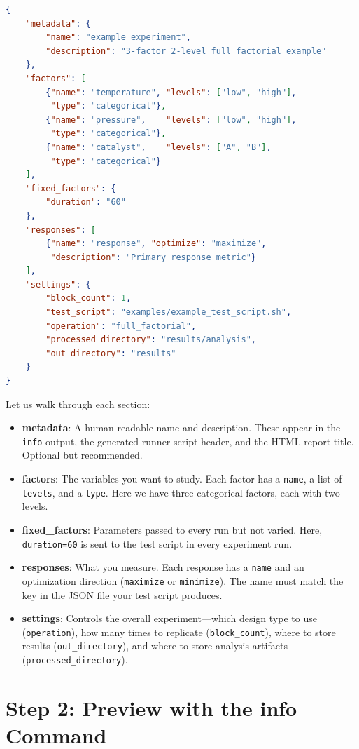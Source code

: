 \documentclass[11pt]{book}
\begin{document}
\begin{lstlisting}[language=json]
{
    "metadata": {
        "name": "example experiment",
        "description": "3-factor 2-level full factorial example"
    },
    "factors": [
        {"name": "temperature", "levels": ["low", "high"],
         "type": "categorical"},
        {"name": "pressure",    "levels": ["low", "high"],
         "type": "categorical"},
        {"name": "catalyst",    "levels": ["A", "B"],
         "type": "categorical"}
    ],
    "fixed_factors": {
        "duration": "60"
    },
    "responses": [
        {"name": "response", "optimize": "maximize",
         "description": "Primary response metric"}
    ],
    "settings": {
        "block_count": 1,
        "test_script": "examples/example_test_script.sh",
        "operation": "full_factorial",
        "processed_directory": "results/analysis",
        "out_directory": "results"
    }
}
\end{lstlisting}

Let us walk through each section:

\begin{itemize}
  \item \textbf{metadata}: A human-readable name and description. These appear in the \texttt{info} output, the generated runner script header, and the HTML report title. Optional but recommended.
  \item \textbf{factors}: The variables you want to study. Each factor has a \texttt{name}, a list of \texttt{levels}, and a \texttt{type}. Here we have three categorical factors, each with two levels.
  \item \textbf{fixed\_factors}: Parameters passed to every run but not varied. Here, \texttt{duration=60} is sent to the test script in every experiment run.
  \item \textbf{responses}: What you measure. Each response has a \texttt{name} and an optimization direction (\texttt{maximize} or \texttt{minimize}). The name must match the key in the JSON file your test script produces.
  \item \textbf{settings}: Controls the overall experiment---which design type to use (\texttt{operation}), how many times to replicate (\texttt{block\_count}), where to store results (\texttt{out\_directory}), and where to store analysis artifacts (\texttt{processed\_directory}).
\end{itemize}

\section{Step 2: Preview with the info Command}
\end{document}
